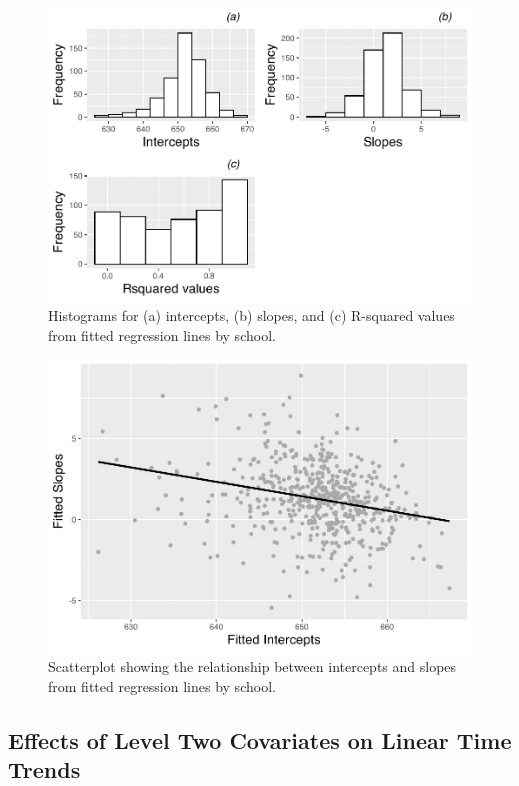 \documentclass[
]{krantz}
\begin{document}
\begin{figure}

{\centering \includegraphics[width=0.6\linewidth]{bookdown-BeyondMLR_files/figure-latex/lon-histmat1-1} 

}

\caption{ Histograms for (a) intercepts, (b) slopes, and (c) R-squared values from fitted regression lines by school.}\label{fig:lon-histmat1}
\end{figure}

\begin{figure}

{\centering \includegraphics[width=0.6\linewidth]{bookdown-BeyondMLR_files/figure-latex/lon-scat5-1} 

}

\caption{Scatterplot showing the relationship between intercepts and slopes from fitted regression lines by school.}\label{fig:lon-scat5}
\end{figure}

\hypertarget{lineartwostageL2effects}{%
\subsection{Effects of Level Two Covariates on Linear Time Trends}\label{lineartwostageL2effects}}
\end{document}
